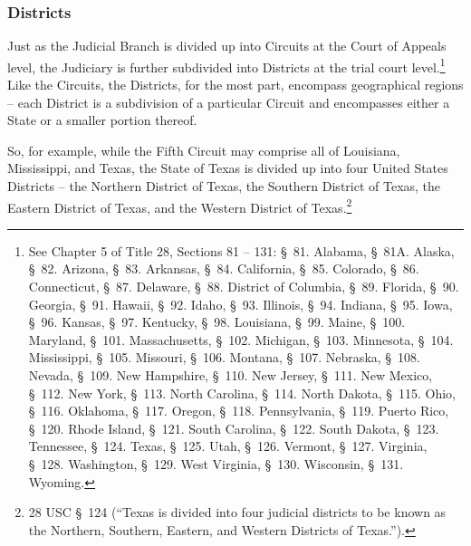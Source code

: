 \subsubsection{Districts}
Just as the Judicial Branch is divided up into Circuits at the Court of Appeals level, the Judiciary is further subdivided into Districts at the trial court level.\footnote{See Chapter 5 of Title 28, Sections 81 -- 131:  \S\ 81. Alabama, \S\ 81A. Alaska, \S\ 82. Arizona, \S\ 83. Arkansas, \S\ 84. California, \S\ 85. Colorado, \S\ 86. Connecticut, \S\ 87. Delaware, \S\ 88. District of Columbia, \S\ 89. Florida, \S\ 90. Georgia, \S\ 91. Hawaii, \S\ 92. Idaho, \S\ 93. Illinois, \S\ 94. Indiana, \S\ 95. Iowa, \S\ 96. Kansas, \S\ 97. Kentucky, \S\ 98. Louisiana, \S\ 99. Maine, \S\ 100. Maryland, \S\ 101. Massachusetts, \S\ 102. Michigan, \S\ 103. Minnesota, \S\ 104. Mississippi, \S\ 105. Missouri, \S\ 106. Montana, \S\ 107. Nebraska, \S\ 108. Nevada, \S\ 109. New Hampshire, \S\ 110. New Jersey, \S\ 111. New Mexico, \S\ 112. New York, \S\ 113. North Carolina, \S\ 114. North Dakota, \S\ 115. Ohio, \S\ 116. Oklahoma, \S\ 117. Oregon, \S\ 118. Pennsylvania, \S\ 119. Puerto Rico, \S\ 120. Rhode Island, \S\ 121. South Carolina, \S\ 122. South Dakota, \S\ 123. Tennessee, \S\ 124. Texas, \S\ 125. Utah, \S\ 126. Vermont, \S\ 127. Virginia, \S\ 128. Washington, \S\ 129. West Virginia, \S\ 130. Wisconsin, \S\ 131. Wyoming.}  
Like the Circuits, the Districts, for the most part, encompass geographical regions -- each District is a subdivision of a particular Circuit and encompasses either a State or a smaller portion thereof.

So, for example, while the Fifth Circuit may comprise all of Louisiana, Mississippi, and Texas, the State of Texas is divided up into four United States Districts -- the Northern District of Texas, the Southern District of Texas, the Eastern District of Texas, and the Western District of Texas.\footnote{28 USC \S\ 124 (``Texas is divided into four judicial districts to be known as the Northern, Southern, Eastern, and Western Districts of Texas.'').}

